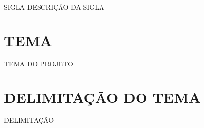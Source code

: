 \documentclass{unemat-tex}
\begin{document}

\frenchspacing 

\pretextual

\imprimircapa

\imprimirfolhaderosto

\listoffigures*
\cleardoublepage


\listoftables*
\cleardoublepage

\begin{siglas}
	\item [SIGLA] {DESCRIÇÃO DA SIGLA}
\end{siglas}


\tableofcontents*
\cleardoublepage

\textual


\chapter{TEMA}
TEMA DO PROJETO
	
\chapter{DELIMITAÇÃO DO TEMA}	
	DELIMITAÇÃO
	
\end{document}
